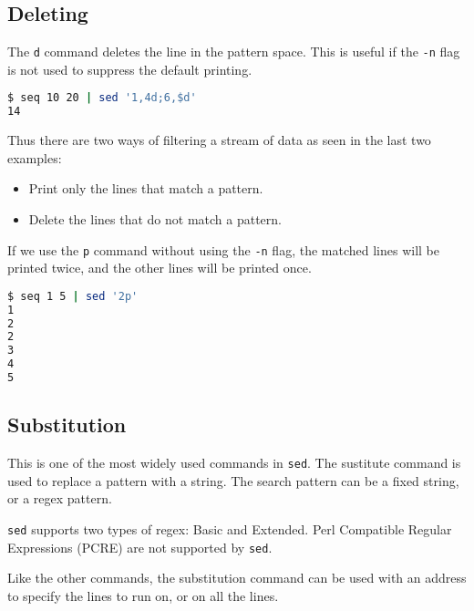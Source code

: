 \subsection{Deleting}

The \lstinline|d| command deletes the line in the pattern space.
This is useful if the \lstinline|-n| flag is not used to suppress the default printing.

\begin{lstlisting}[language=bash]
$ seq 10 20 | sed '1,4d;6,$d'
14
\end{lstlisting}

Thus there are two ways of filtering a stream of data as seen in the last two examples:
\begin{itemize}
  \item Print only the lines that match a pattern.
  \item Delete the lines that do not match a pattern.
\end{itemize}

\begin{remark}
  If we use the \lstinline|p| command without using the \lstinline|-n| flag, the matched lines will be printed twice, and the other lines will be printed once.
\end{remark}

\begin{lstlisting}[language=bash]
$ seq 1 5 | sed '2p'
1
2
2
3
4
5
\end{lstlisting}

\subsection{Substitution}

This is one of the most widely used commands in \lstinline|sed|.
The sustitute command is used to replace a pattern with a string.
The search pattern can be a fixed string, or a regex pattern.

\begin{remark}
  \lstinline|sed| supports two types of regex: Basic and Extended.
  Perl Compatible Regular Expressions (PCRE) are not supported by \lstinline|sed|.
\end{remark}

Like the other commands, the substitution command can be used with an address to specify the lines to run on, or on all the lines.

